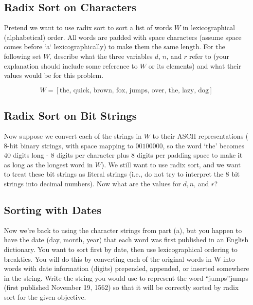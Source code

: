 \documentclass [12pt]{article}
\begin{document}
\subsection{Radix Sort on Characters }

Pretend we want to use radix sort to sort a list of words $W$ in lexicographical (alphabetical) order. All words are padded with space characters (assume space comes before `a` lexicographically) to make them the same length. For the following set $W$, describe what the three variables $d$, $n$, and $r$ refer to (your explanation should include some reference to $W$ or its elements) and what their values would be for this problem.

$$
W = [\text{the, quick, brown, fox, jumps, over, the, lazy, dog}]
$$


\subsection{Radix Sort on Bit Strings }
Now suppose we convert each of the strings in $W$ to their ASCII representations ($8$-bit binary strings, with space mapping to $00100000$, so the word `the' becomes $40$ digits long - 8 digits per character plus 8 digits per padding space to make it as long as the longest word in $W$). We still want to use radix sort, and we want to treat these bit strings as literal strings (i.e., do not try to interpret the 8 bit strings into decimal
numbers). Now what are the values for $d, n$, and $r$?


\subsection{Sorting with Dates } 
Now we're back to using the character strings from part (a), but you happen to have the date (day, month, year) that each word was first published in an English dictionary. You want to sort first by date, then use lexicographical ordering to breakties. You will do this by converting each of the original words in W into words with date information (digits) prepended, appended, or inserted somewhere in the string. Write the string you would use to represent the word ``jumps''jumps (first published November 19, 1562) so that it will be correctly sorted by radix sort for the given objective.
\end{document}
